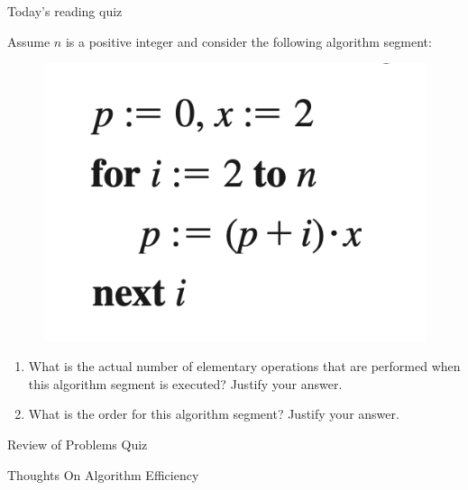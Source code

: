 \documentclass[10pt]{beamer}
\begin{document}
\begin{frame}[standout]
Today's reading quiz
\end{frame}

\begin{frame}
\small 
\begin{myredbox}[title=Reading Quiz (Algorithm Efficiency)]
Assume $n$ is a positive integer and consider the following algorithm segment:
\begin{figure}
\includegraphics[width=.6\textwidth]{images/algorithm_segment.png}	
\end{figure}
\begin{enumerate}
	\item What is the actual number of elementary operations that are performed when this algorithm segment is executed? Justify your answer.
	\item What is the order for this algorithm segment? Justify your answer.
\end{enumerate}
\end{myredbox}
\end{frame}


\begin{frame}[standout]
Review of Problems Quiz
\end{frame}



\begin{frame}[standout]
Thoughts On Algorithm Efficiency
\end{frame}
\end{document}
